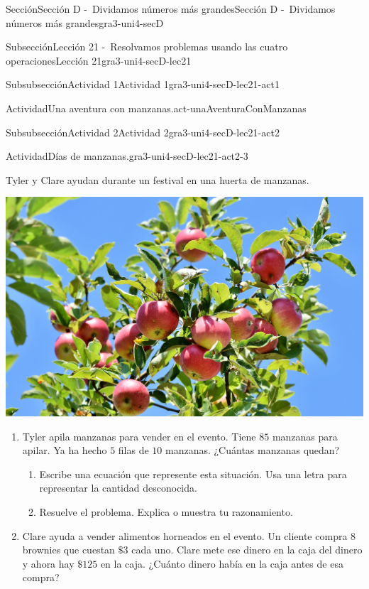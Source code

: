 \documentclass[twoside,10pt,]{article}
\begin{document}
\begin{sectionptx}{Sección}{Sección D -~Dividamos números más grandes}{}{Sección D -~Dividamos números más grandes}{}{}{gra3-uni4-secD}
\begin{subsectionptx}{Subsección}{Lección 21 -~Resolvamos problemas usando las cuatro operaciones}{}{Lección 21}{}{}{gra3-uni4-secD-lec21}
\begin{subsubsectionptx}{Subsubsección}{Actividad 1}{}{Actividad 1}{}{}{gra3-uni4-secD-lec21-act1}
\begin{activity}{Actividad}{Una aventura con manzanas.}{act-unaAventuraConManzanas}
\begin{image}{0}{1}{0}{}
\end{image}%
\end{activity}%
\end{subsubsectionptx}
%
%
\typeout{************************************************}
\typeout{************************************************}
%
\begin{subsubsectionptx}{Subsubsección}{Actividad 2}{}{Actividad 2}{}{}{gra3-uni4-secD-lec21-act2}
\begin{activity}{Actividad}{Días de manzanas.}{gra3-uni4-secD-lec21-act2-3}%
\begin{sidebyside}{2}{0}{0.05}{0.05}%
\begin{sbspanel}{0.6}%
Tyler y Clare ayudan durante un festival en una huerta de manzanas.%
\end{sbspanel}%
\begin{sbspanel}{0.3}%
\includegraphics[width=\linewidth]{external/jpg-source/apple-3535566_1920.jpg}
\end{sbspanel}%
\end{sidebyside}%
%
\begin{enumerate}
\item{}Tyler apila manzanas para vender en el evento. Tiene \(85\) manzanas para apilar. Ya ha hecho \(5\) filas de \(10\) manzanas. ¿Cuántas manzanas quedan?%
%
\begin{enumerate}
\item{}Escribe una ecuación que represente esta situación. Usa una letra para representar la cantidad desconocida.%
\item{}Resuelve el problema. Explica o muestra tu razonamiento.%
\end{enumerate}
\item{}Clare ayuda a vender alimentos horneados en el evento. Un cliente compra \(8\) brownies que cuestan \(\$3\) cada uno. Clare mete ese dinero en la caja del dinero y ahora hay \(\$125\) en la caja. ¿Cuánto dinero había en la caja antes de esa compra?%

\end{enumerate}
\end{activity}
\end{subsubsectionptx}
\end{subsectionptx}
\end{sectionptx}
\end{document}
